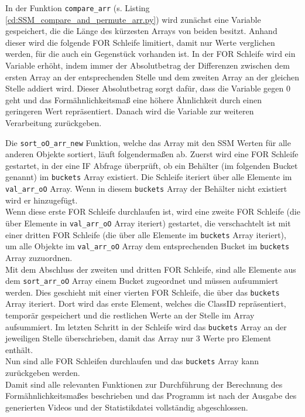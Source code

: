 {	In der Funktion \lstinline|compare_arr| \ifimportant (s. Listing \ref{cd:SSM_compare_and_permute_arr.py}) \fi wird zunächst eine Variable gespeichert, die die Länge des kürzesten Arrays von beiden besitzt. Anhand dieser wird die folgende FOR Schleife limitiert, damit nur Werte verglichen werden, für die auch ein Gegenstück vorhanden ist.
	In der FOR Schleife wird ein Variable erhöht, indem immer der Absolutbetrag der Differenzen zwischen dem ersten Array an der entsprechenden Stelle und dem zweiten Array an der gleichen Stelle addiert wird. Dieser Absolutbetrag sorgt dafür, dass die Variable gegen 0 geht und das Formähnlichkeitsmaß eine höhere Ähnlichkeit durch einen geringeren Wert repräsentiert. Danach wird die Variable zur weiteren Verarbeitung zurückgeben. \\
	\ifimportant
	
	\fi

	Die \lstinline|sort_oO_arr_new| Funktion, welche das Array mit den SSM Werten für alle anderen Objekte sortiert,  läuft folgendermaßen ab. Zuerst wird eine FOR Schleife gestartet, in der eine IF Abfrage überprüft, ob ein Behälter (im folgenden \glqq Bucket\grqq{} genannt) im \lstinline|buckets| Array existiert. Die Schleife iteriert über alle Elemente im  \lstinline|val_arr_oO| Array. Wenn in diesem \lstinline|buckets| Array der Behälter nicht existiert wird er hinzugefügt. \\
	Wenn diese erste FOR Schleife durchlaufen ist, wird eine zweite FOR Schleife (die über Elemente in \lstinline|val_arr_oO| Array iteriert) gestartet, die verschachtelt ist mit einer dritten FOR Schleife (die über alle Elemente im \lstinline|buckets| Array iteriert), um alle Objekte im \lstinline|val_arr_oO| Array dem entsprechenden Bucket im \lstinline|buckets| Array zuzuordnen. \\
	Mit dem Abschluss der zweiten und dritten FOR Schleife, sind alle Elemente aus dem \lstinline|sort_arr_oO| Array einem Bucket zugeordnet und müssen aufsummiert werden. Dies geschieht mit einer vierten FOR Schleife, die über das \lstinline|buckets| Array iteriert. Dort wird das erste Element, welches die ClassID repräsentiert, temporär gespeichert und die restlichen Werte an der Stelle im Array aufsummiert. Im letzten Schritt in der Schleife wird das \lstinline|buckets| Array an der jeweiligen Stelle überschrieben, damit das Array nur 3 Werte pro Element enthält. \\ 
	Nun sind alle FOR Schleifen durchlaufen und das \lstinline|buckets| Array kann zurückgeben werden. \\

	Damit sind alle relevanten Funktionen zur Durchführung der Berechnung des Formähnlichkeitsmaßes beschrieben und das Programm ist nach der Ausgabe des generierten Videos und der Statistikdatei vollständig abgeschlossen.

}







